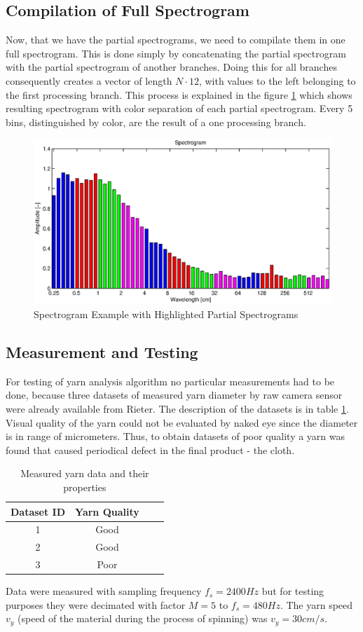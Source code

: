 \documentclass[twoside]{ctuthesis}
\theoremstyle{plain}
\theoremstyle{definition}
\theoremstyle{note}
\begin{document}
\subsection{Compilation of Full Spectrogram}
Now, that we have the partial spectrograms, we need to compilate them in one full spectrogram. This is done simply by concatenating the partial spectrogram with the partial spectrogram of another branches. Doing this for all branches consequently creates a vector of length $N\cdot 12$, with values to the left belonging to the first processing branch. This process is explained in the figure \ref{fig:yarnSpec_color} which shows resulting spectrogram with color separation of each partial spectrogram. Every 5 bins, distinguished by color, are the result of a one processing branch.
\begin{figure}[h]
	\centering
	\includegraphics[width=1.0\textwidth]{sp_barevny.eps}
	\caption{Spectrogram Example with Highlighted Partial Spectrograms}
	\label{fig:yarnSpec_color}
\end{figure}

\subsection{Measurement and Testing}
For testing of yarn analysis algorithm no particular measurements had to be done, because three datasets of measured yarn diameter by raw camera sensor were already available from Rieter. The description of the datasets is in table \ref{tab:measuredDataYarn}. Visual quality of the yarn could not be evaluated by naked eye since the diameter is in range of micrometers. Thus, to obtain datasets of poor quality a yarn was found that caused periodical defect in the final product - the cloth.
\begin{table}[htbp]
	\centering
	\caption{Measured yarn data and their properties}
	\begin{tabular}{cccc}
		\toprule
		Dataset ID & Yarn Quality \\
		\midrule
		1     & Good \\
		2     & Good \\
		3     & Poor \\
		\bottomrule
	\end{tabular}%
	\label{tab:measuredDataYarn}%
\end{table}%
Data were measured with sampling frequency $f_s=2400 Hz$ but for testing purposes they were decimated with factor $M = 5$ to $f_s=480Hz$. The yarn speed $v_y$ (speed of the material during the process of spinning) was $v_y=30cm/s$.
\end{document}
